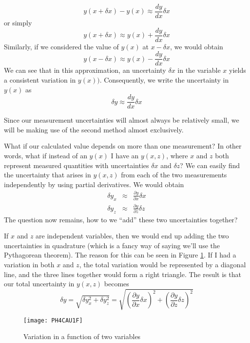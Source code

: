 \begin{enumerate}
        \begin{equation*}
            y(x+\delta x)-y(x) \approx \frac{dy}{dx}\delta x
        \end{equation*}
        or simply
        \begin{equation}
            y(x+\delta x) \approx y(x)+\frac{dy}{dx}\delta x
        \end{equation}
        Similarly, if we considered the value of $y(x)$ at $x-\delta x$, 
        we would obtain
        \begin{equation}
            y(x-\delta x) \approx y(x)-\frac{dy}{dx}\delta x
        \end{equation}
        We can see that in this approximation, an uncertainty $\delta x$ in 
        the variable $x$ yields a consistent variation in $y(x))$. 
        Consequently, we write
        the uncertainty in $y(x)$ as
        \begin{equation}
            \delta y\approx\frac{dy}{dx}\delta x
        \end{equation}            
\end{enumerate}
Since our measurement uncertainties will almost always be relatively small,
we will be making use of the second method almost exclusively.

What if our calculated value depends on more than one measurement? In other
words, what if instead of an $y(x)$ I have an $y(x,z)$, where $x$ and $z$
both represent measured quantities with uncertainties $\delta x$ and
$\delta z$? We can easily find the uncertainty that arises in $y(x,z)$ from
each of the two measurements independently by using partial derivatives. We
would obtain
\begin{eqnarray}
    \delta y_x &\approx& \frac{\partial y}{\partial x}\delta x\\
    \delta y_z &\approx& \frac{\partial y}{\partial z}\delta z
\end{eqnarray}
The question now remains, how to we ``add'' these two uncertainties together?

If $x$ and $z$ are independent variables, then we would end up adding the
two uncertainties in quadrature (which is a fancy way of saying we'll use
the Pythagorean theorem). The reason for this can be seen in Figure 
\ref{fig:2d_derivative}. If I had a variation in both $x$ and $z$, the 
total variation would be represented by a diagonal line, and the three
lines together would form a right triangle. The result is that our total
uncertainty in $y(x,z)$ becomes
\begin{equation}
    \delta y=\sqrt{\delta y_x^2+\delta y_z^2}=
    \sqrt{\left(\frac{\partial y}{\partial x}\delta x\right)^2+
    \left(\frac{\partial y}{\partial z}\delta z\right)^2}
\end{equation}
\begin{figure}[htbp!]
\centering
\texttt{[image: PH4CAU1F]}
\caption[Variation in a function of two variables]{Variation in a 
function of two variables}
\label{fig:2d_derivative}
\end{figure}

